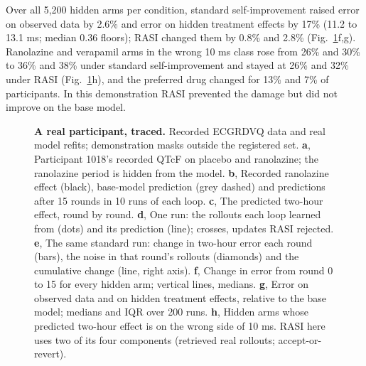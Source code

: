 \documentclass[11pt,a4paper]{article}
\begin{document}
Over all 5,200 hidden arms per condition, standard self-improvement raised error on observed data by 2.6\% and error on hidden treatment effects by 17\% (11.2 to 13.1 ms; median 0.36 floors); RASI changed them by 0.8\% and 2.8\% (Fig.~\ref{fig:demo}f,g). Ranolazine and verapamil arms in the wrong 10 ms class rose from 26\% and 30\% to 36\% and 38\% under standard self-improvement and stayed at 26\% and 32\% under RASI (Fig.~\ref{fig:demo}h), and the preferred drug changed for 13\% and 7\% of participants. In this demonstration RASI prevented the damage but did not improve on the base model.

\begin{figure}[!htbp]\centering
{}
\caption{\textbf{A real participant, traced.} Recorded ECGRDVQ data and real model refits; demonstration masks outside the registered set. \textbf{a}, Participant 1018's recorded QTcF on placebo and ranolazine; the ranolazine period is hidden from the model. \textbf{b}, Recorded ranolazine effect (black), base-model prediction (grey dashed) and predictions after 15 rounds in 10 runs of each loop. \textbf{c}, The predicted two-hour effect, round by round. \textbf{d}, One run: the rollouts each loop learned from (dots) and its prediction (line); crosses, updates RASI rejected. \textbf{e}, The same standard run: change in two-hour error each round (bars), the noise in that round's rollouts (diamonds) and the cumulative change (line, right axis). \textbf{f}, Change in error from round 0 to 15 for every hidden arm; vertical lines, medians. \textbf{g}, Error on observed data and on hidden treatment effects, relative to the base model; medians and IQR over 200 runs. \textbf{h}, Hidden arms whose predicted two-hour effect is on the wrong side of 10 ms. RASI here uses two of its four components (retrieved real rollouts; accept-or-revert).}\label{fig:demo}
\end{figure}
\FloatBarrier
\end{document}
